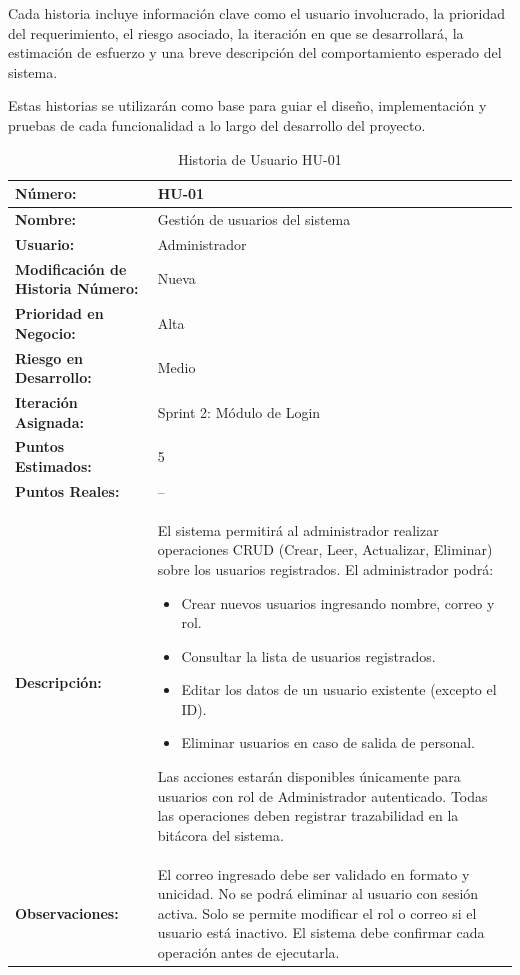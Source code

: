 Cada historia incluye información clave como el usuario involucrado, la prioridad del requerimiento, el riesgo asociado, la iteración en que se desarrollará, la estimación de esfuerzo y una breve descripción del comportamiento esperado del sistema.

Estas historias se utilizarán como base para guiar el diseño, implementación y pruebas de cada funcionalidad a lo largo del desarrollo del proyecto.

\begin{table}[h]
	\centering
	\caption{Historia de Usuario HU-01}
	\begin{tabular}{|p{5cm}|p{9cm}|}
		\hline
		\textbf{Número:}                          & HU-01                           \\ \hline
		\textbf{Nombre:}                          & Gestión de usuarios del sistema \\ \hline
		\textbf{Usuario:}                         & Administrador                   \\ \hline
		\textbf{Modificación de Historia Número:} & Nueva                           \\ \hline
		\textbf{Prioridad en Negocio:}            & Alta                            \\ \hline
		\textbf{Riesgo en Desarrollo:}            & Medio                           \\ \hline
		\textbf{Iteración Asignada:}              & Sprint 2: Módulo de Login       \\ \hline
		\textbf{Puntos Estimados:}                & 5                               \\ \hline
		\textbf{Puntos Reales:}                   & --                              \\ \hline
		\textbf{Descripción:}                     &
		El sistema permitirá al administrador realizar operaciones CRUD (Crear, Leer, Actualizar, Eliminar) sobre los usuarios registrados.
		El administrador podrá:
		\begin{itemize}
			\item Crear nuevos usuarios ingresando nombre, correo y rol.
			\item Consultar la lista de usuarios registrados.
			\item Editar los datos de un usuario existente (excepto el ID).
			\item Eliminar usuarios en caso de salida de personal.
		\end{itemize}
		Las acciones estarán disponibles únicamente para usuarios con rol de Administrador autenticado. Todas las operaciones deben registrar trazabilidad en la bitácora del sistema.
		\\ \hline
		\textbf{Observaciones:}                   &
		El correo ingresado debe ser validado en formato y unicidad. No se podrá eliminar al usuario con sesión activa.
		Solo se permite modificar el rol o correo si el usuario está inactivo.
		El sistema debe confirmar cada operación antes de ejecutarla.
		\\ \hline
	\end{tabular}
\end{table}


